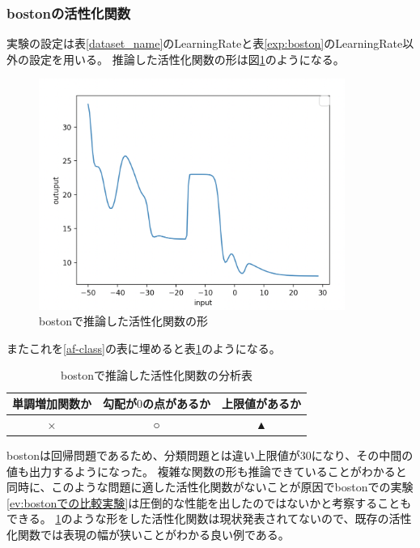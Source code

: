 \subsubsection{bostonの活性化関数}
実験の設定は表\ref{dataset_name}のLearningRateと表\ref{exp:boston}のLearningRate以外の設定を用いる。
推論した活性化関数の形は図\ref{infer_boston}のようになる。
\begin{figure}[hbtp]
    \begin{center}
        \includegraphics[width=10cm]{asset/boston-0.00001.png}
            \caption{bostonで推論した活性化関数の形}
            \label{infer_boston}
    \end{center}
\end{figure}

またこれを\ref{af-class}の表に埋めると表\ref{anal_boston}のようになる。
\begin{table}[htbp]
    \begin{center}
        \caption{bostonで推論した活性化関数の分析表}
        \label{anal_boston}
        \vspace{2mm} 
        \begin{tabular}{ |c|c|c| }
        \hline
        単調増加関数か & 勾配が$ 0 $の点があるか & 上限値があるか   \\
        \hline
        × & ○ & ▲   \\
        \hline
        \end{tabular}
    \end{center}
\end{table}


bostonは回帰問題であるため、分類問題とは違い上限値が30になり、その中間の値も出力するようになった。
複雑な関数の形も推論できていることがわかると同時に、このような問題に適した活性化関数がないことが原因でbostonでの実験\ref{ev:bostonでの比較実験}は圧倒的な性能を出したのではないかと考察することもできる。
\ref{infer_boston}のような形をした活性化関数は現状発表されてないので、既存の活性化関数では表現の幅が狭いことがわかる良い例である。





